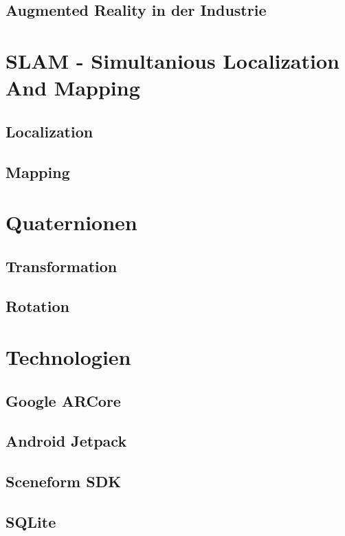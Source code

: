 \subsection{Augmented Reality in der Industrie}

\section{SLAM - Simultanious Localization And Mapping}
\label{chap:SLAM}
\subsection{Localization}
\subsection{Mapping}

\section{Quaternionen}
\label{chap:Quaternionen}
\subsection{Transformation}
\subsection{Rotation}

\section{Technologien}
\label{chap:Technologien}
\subsection{Google ARCore}
\subsection{Android Jetpack}
\subsection{Sceneform SDK}
\subsection{SQLite}

